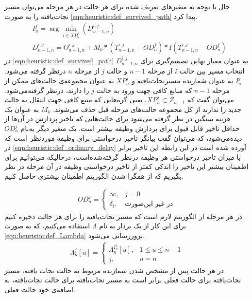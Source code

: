 	حال با توجه به متغیرهای تعریف شده برای هر حالت در هر مرحله می‌توان مسیر نجات‌یافته را به صورت \cref{eqn:heuristic:def_survived_path} پیدا کرد. 
	\begin{align}\label{eqn:heuristic:def_survived_path}
		&I_n^j = \arg \min_{i \in XP_n^j} (D_{n-1,n}^{i,j}) \\
		&D_{n-1,n}^{i,j} = \Theta_{n-1,n}^{i,j} + M_k * (T_{n-1,n}^{i,j} - OD_n^j) * I(T_{n-1,n}^{i,j} - OD_n^j)
	\end{align}	
در \cref{eqn:heuristic:def_survived_path} $D_{n-1,n}^{i,j}$ به عنوان معیار نهایی تصمیم‌گیری برای انتخاب مسیر بین حالت $i$ از مرحله $n-1$ و حالت $j$ از مرحله $n$ درنظر گرفته می‌شود. $I_n^j$ به عنوان شمارنده مسیرنجات‌یافته و $XP_n^j$ به عنوان مجموعه‌ی حالت‌های ممکن از مرحله $n-1$ که منابع کافی جهت ورود به حالت $j$ را دارند، درنظر گرفته‌می‌شود. می‌توان گفت که $XP_n^j \subset Z_{n-1}$، یعنی گره‌هایی که منبع کافی جهت انتقال به حالت جدید را ندارند از کل مجموعه حالت‌های مرحله قبل حذف می‌شوند. $M_k$ به عنوان یک هزینه سنگین در نظر گرفته می‌شود برای حالت‌هایی که تاخیر پردازش در آن‌ها از حداقل تاخیر قابل قبول برای پردازش وظیفه بیشتر است. یک متغیر دیگر به‌نام $OD_n^j$ دیده‌می‌شود، که می‌توان گفت بیانگر تاخیر درخواستی برای وظیفه موردنظر است که در \cref{eqn:heuristic:def_ordinary_delay} آورده شده است در این رابطه این تاخیر برابر با میزان تاخیر درخواستی هر وظیفه درنظر گرفته‌شده‌است، درحالیکه می‌توانیم برای اطمینان بیشتر این تاخیر را اندکی کمتر از تاخیر درخواستی وظیفه در آن مرحله در نظر بگیریم که از همگرا شدن الگوریتم اطمینان بیشتری حاصل کنیم. 

	\begin{align}\label{eqn:heuristic:def_ordinary_delay}
		OD_n^j = 
		\begin{cases}
			\infty, & \text{$j = 0$} \\
			\delta_t,& \text{در غیر این‌صورت}
		\end{cases}
	\end{align}
	در هر مرحله از الگوریتم لازم است که مسیر نجات‌یافته را برای هر حالت ذخیره کنیم برای این کار از یک بردار به نام $\Lambda$ استفاده می‌کنیم، که به صورت \cref{eqn:heuristic:def_Lambda} بروزرسانی می‌شود. 
	\begin{align}\label{eqn:heuristic:def_Lambda}
		\Lambda_n^j[u] = 
		\begin{cases}
			\Lambda_n^{I_n^j}[u], & 1 \le u \le n-1 \\
			j, 				& u = n
		\end{cases}
	\end{align}
	در هر حالت پس از مشخص شدن شمارنده مربوط به حالت نجات یافته، مسیر نجات‌یافته برای حالت فعلی برابر است به مسیر نجات‌یافته برای حالت نجات‌یافته، به اضافه‌ی خود حالت فعلی. 

